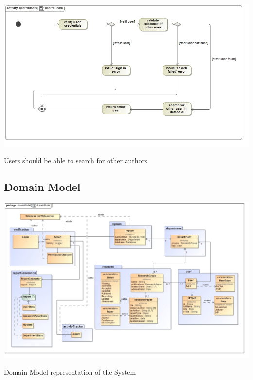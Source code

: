 \documentclass[a4paper,12pt]{report}
\begin{document}
\begin{flushleft}
	\includegraphics[scale=0.5]{./images/act__searchUsers__searchUsers.jpg} 
	\begin{center}
		Users should be able to search for other authors
	\end{center}
\end{flushleft}

\newpage

\subsection{Domain Model}
\begin{center}
	\includegraphics[scale=0.43]{./images/domainModel.jpg} 
	\begin{center}
		Domain Model representation of the System
	\end{center}
\end{center}

\newpage
\end{document}
